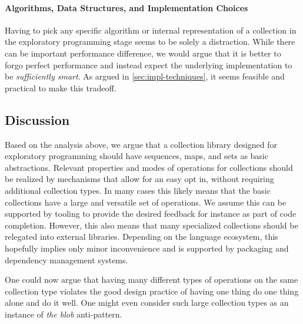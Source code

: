 \documentclass[sigconf, authorversion]{acmart}
\begin{document}
\paragraph{Algorithms, Data Structures, and Implementation Choices}

Having to pick any specific algorithm or internal representation of a collection
in the exploratory programming stage seems to be solely a distraction.
While there can be important performance difference,
we would argue that it is better to forgo perfect performance
and instead expect the underlying implementation
to be \emph{sufficiently smart}.
As argued in \cref{sec:impl-techniques},
it seems feasible and practical to make this tradeoff.


\subsection{Discussion}

Based on the analysis above,
we argue that a collection library designed for exploratory programming
should have sequences, maps, and sets as basic abstractions.
Relevant properties and modes of operations for collections should be
realized by mechanisms that allow for an easy opt in,
without requiring additional collection types.
In many cases this likely means
that the basic collections have a large and versatile set of operations.
We assume this can be supported by tooling to provide the desired feedback
for instance as part of code completion.
However, this also means that many specialized collections should be relegated
into external libraries.
Depending on the language ecosystem,
this hopefully implies only minor inconvenience
and is supported by packaging and dependency management systems.

One could now argue that having many different types of operations
on the same collection type violates the good design practice
of having one thing do one thing alone and do it well.
One might even consider such large collection types as
an instance of \emph{the blob} anti-pattern.\citep{brown1998antipatterns}
\end{document}
